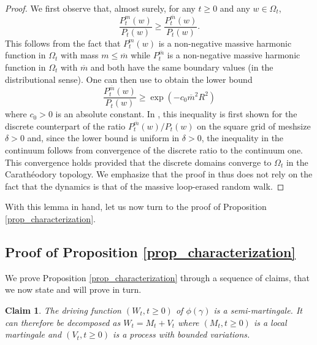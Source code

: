 \documentclass{article}
\newtheorem{claim}[theorem]{Claim}
\theoremstyle{definition}
\theoremstyle{remark}
\theoremstyle{remark}
\begin{document}
\begin{proof}
We first observe that, almost surely, for any $t \geq 0$ and any $w \in \Omega_t$,
\begin{equation*}
    \frac{P_{t}^m(w)}{P_{t}(w)} \geq \frac{P_{t}^{\overline{m}}(w)}{P_{t}(w)}.
\end{equation*}
This follows from the fact that $P_t^m(w)$ is a non-negative massive harmonic function in $\Omega_t$ with mass $m \leq \overline{m}$ while $P_t^{\overline{m}}$ is a non-negative massive harmonic function in $\Omega_t$ with $\overline{m}$ and both have the same boundary values (in the distributional sense). One can then use \cite[Equation~(4.10)]{mLERW} to obtain the lower bound
\begin{equation*}
    \frac{P_{t}^{\overline{m}}(w)}{P_{t}(w)} \geq \exp(-c_0\overline{m}^2R^2)
\end{equation*}
where $c_0 > 0$ is an absolute constant. In \cite{mLERW}, this inequality is first shown for the discrete counterpart of the ratio $P_{t}^{\overline{m}}(w)/P_{t}(w)$ on the square grid of meshsize $\delta >0$ and, since the lower bound is uniform in $\delta > 0$, the inequality in the continuum follows from convergence of the discrete ratio to the continuum one. This convergence holds provided that the discrete domains converge to $\Omega_t$ in the Carath\'eodory topology. We emphasize that the proof in \cite{mLERW} thus does not rely on the fact that the dynamics is that of the massive loop-erased random walk.
\end{proof}

With this lemma in hand, let us now turn to the proof of Proposition \ref{prop_characterization}.

\subsection{Proof of Proposition \ref{prop_characterization}} \label{subsec_Proof}

We prove Proposition \ref{prop_characterization} through a sequence of claims, that we now state and will prove in turn.

\begin{claim}\label{claim_semimartingale}
The driving function $(W_t, t \geq 0)$ of $\phi(\gamma)$ is a semi-martingale. It can therefore be decomposed as $W_t = M_t + V_t$ where $(M_t, t \geq 0)$ is a local martingale and $(V_t, t \geq 0)$ is a process with bounded variations.
\end{claim}
\end{document}
